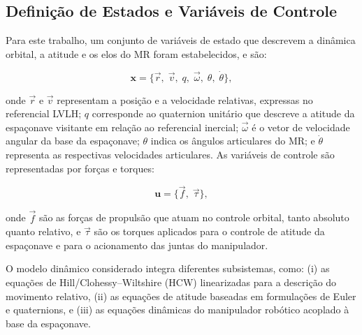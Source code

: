\subsection{Definição de Estados e Variáveis de Controle}
\label{sec:var_estado_controle}

Para este trabalho, um conjunto de variáveis de estado que descrevem a dinâmica orbital, a atitude e os elos do MR foram estabelecidos, e são:

\begin{equation}
    \label{eq:variaveis_estado}
    \mathbf{x} =
    \{ \vec r,\; \vec v,\; q,\; \vec \omega,\; \theta,\; \dot\theta \},
\end{equation}

onde $\vec r$ e $\vec v$ representam a posição e a velocidade relativas, expressas no referencial LVLH;
$q$ corresponde ao quaternion unitário que descreve a atitude da espaçonave visitante em relação ao referencial inercial;
$\vec \omega$ é o vetor de velocidade angular da base da espaçonave;
$\theta$ indica os ângulos articulares do MR;
e $\dot \theta$ representa as respectivas velocidades articulares.
As variáveis de controle são representadas por forças e torques:

\begin{equation}
    \label{eq:variaveis_controle}
    \mathbf{u} =
    \{ \vec f,\; \vec \tau \},
\end{equation}

onde $\vec f$ são as forças de propulsão que atuam no controle orbital, tanto absoluto quanto relativo, e $\vec \tau$ são os torques aplicados para o controle de atitude da espaçonave e para o acionamento das juntas do manipulador.

O modelo dinâmico considerado integra diferentes subsistemas, como:
(i) as equações de Hill/Clohessy--Wiltshire (HCW) linearizadas para a descrição do movimento relativo,
(ii) as equações de atitude baseadas em formulações de Euler e quaternions, e
(iii) as equações dinâmicas do manipulador robótico acoplado à base da espaçonave.
